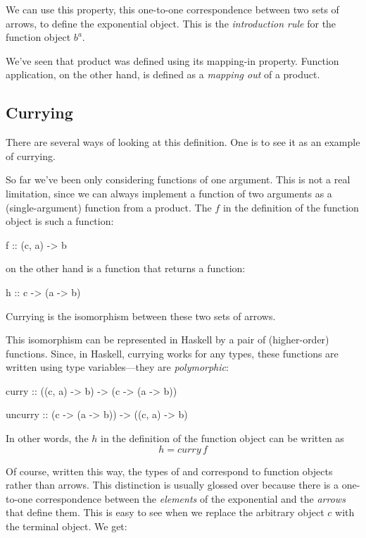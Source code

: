 \documentclass[DaoFP]{subfiles}
\begin{document}
We can use this property, this one-to-one correspondence between two sets of arrows, to define the exponential object. This is the \emph{introduction rule} for the function object $b^a$. 

We've seen that product was defined using its mapping-in property. Function application, on the other hand, is defined as a \emph{mapping out} of a product. 

\subsection{Currying}

There are several ways of looking at this definition. One is to see it as an example of currying. 

So far we've been only considering functions of one argument. This is not a real limitation, since we can always implement a function of two arguments as a (single-argument) function from a product. The $f$ in the definition of the function object is such a function:
\begin{haskell}
f :: (c, a) -> b
\end{haskell}
 on the other hand is a function that returns a function:
\begin{haskell}
h :: c -> (a -> b)
\end{haskell}
Currying is the isomorphism between these two sets of arrows. 

This isomorphism can be represented in Haskell by a pair of (higher-order) functions. Since, in Haskell, currying works for any types, these functions are written using type variables---they are \emph{polymorphic}:
\begin{haskell}
curry   :: ((c, a) -> b)   -> (c -> (a -> b))
\end{haskell}

\begin{haskell}
uncurry :: (c -> (a -> b)) -> ((c, a) -> b)
\end{haskell}
In other words, the $h$ in the definition of the function object can be written as 
\[ h = curry\, f \]

Of course, written this way, the types of  and  correspond to function objects rather than arrows. This distinction is usually glossed over because there is a one-to-one correspondence between the \emph{elements} of the exponential and the \emph{arrows} that define them. This is easy to see when we replace the arbitrary object $c$ with the terminal object. We get:
\end{document}
